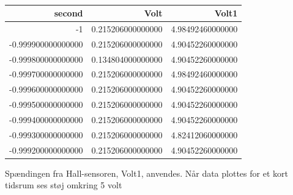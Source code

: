 \begin{table}[h]
  \centering
\begin{tabular}{r|r|r}
\hline
\textbf{second} & \textbf{Volt} & \textbf{Volt1} \\
\hline
-1 & 0.215206000000000 & 4.98492460000000 \\
-0.999900000000000 & 0.215206000000000 & 4.90452260000000 \\
-0.999800000000000 & 0.134804000000000 & 4.90452260000000 \\
-0.999700000000000 & 0.215206000000000 & 4.98492460000000 \\
-0.999600000000000 & 0.215206000000000 & 4.90452260000000 \\
-0.999500000000000 & 0.215206000000000 & 4.90452260000000 \\
-0.999400000000000 & 0.215206000000000 & 4.90452260000000 \\
-0.999300000000000 & 0.215206000000000 & 4.82412060000000 \\
-0.999200000000000 & 0.215206000000000 & 4.90452260000000 \\
\hline
\end{tabular}
  \caption{}
  \label{tab:komp3}
\end{table}

Spændingen fra Hall-sensoren, Volt1, anvendes.
Når data plottes for et kort tidsrum ses støj omkring 5 volt

